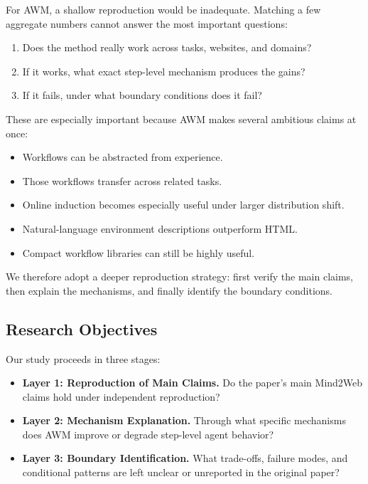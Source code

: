 \documentclass{article}
\providecommand{\tightlist}{%
  \setlength{\itemsep}{0pt}\setlength{\parskip}{0.8em}}
\begin{document}
For AWM, a shallow reproduction would be inadequate. Matching a few
aggregate numbers cannot answer the most important questions:

\begin{enumerate}
\def\labelenumi{\arabic{enumi}.}
\tightlist
\item
  Does the method really work across tasks, websites, and domains?
\item
  If it works, what exact step-level mechanism produces the gains?
\item
  If it fails, under what boundary conditions does it fail?
\end{enumerate}

These are especially important because AWM makes several ambitious
claims at once:

\begin{itemize}
\tightlist
\item
  Workflows can be abstracted from experience.
\item
  Those workflows transfer across related tasks.
\item
  Online induction becomes especially useful under larger distribution
  shift.
\item
  Natural-language environment descriptions outperform HTML.
\item
  Compact workflow libraries can still be highly useful.
\end{itemize}

We therefore adopt a deeper reproduction strategy: first verify the main
claims, then explain the mechanisms, and finally identify the boundary
conditions.

\subsection{Research Objectives}\label{research-objectives}

Our study proceeds in three stages:

\begin{itemize}
\tightlist
\item
  \textbf{Layer 1: Reproduction of Main Claims.} Do the paper's main
  Mind2Web claims hold under independent reproduction?
\item
  \textbf{Layer 2: Mechanism Explanation.} Through what specific
  mechanisms does AWM improve or degrade step-level agent behavior?
\item
  \textbf{Layer 3: Boundary Identification.} What trade-offs, failure
  modes, and conditional patterns are left unclear or unreported in the
  original paper?
\end{itemize}
\end{document}
